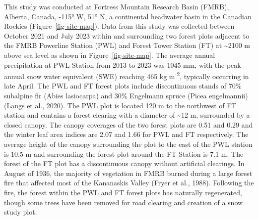 \documentclass[
  letterpaper,
  DIV=11,
  numbers=noendperiod]{scrartcl}
\begin{document}
This study was conducted at Fortress Mountain Research Basin (FMRB),
Alberta, Canada, -115° W, 51° N, a continental headwater basin in the
Canadian Rockies (Figure~\ref{fig-site-map}). Data from this study was
collected between October 2021 and July 2023 within and surrounding two
forest plots adjacent to the FMRB Powerline Station (PWL) and Forest
Tower Station (FT) at \textasciitilde2100 m above sea level as shown in
Figure~\ref{fig-site-map}. The average annual precipitation at PWL
Station from 2013 to 2023 was 1045 mm, with the peak annual snow water
equivalent (SWE) reaching 465 kg m\textsuperscript{-2}, typically
occurring in late April. The PWL and FT forest plots include
discontinuous stands of 70\% subalpine fir (Abies lasiocarpa) and 30\%
Engelmann spruce (Picea engelmannii) (Langs et al., 2020). The PWL plot
is located 120 m to the northwest of FT station and contains a forest
clearing with a diameter of \textasciitilde12 m, surrounded by a closed
canopy. The canopy coverages of the two forest plots are 0.51 and 0.29
and the winter leaf area indices are 2.07 and 1.66 for PWL and FT
respectively. The average height of the canopy surrounding the plot to
the east of the PWL station is 10.5 m and surrounding the forest plot
around the FT Station is 7.1 m. The forest of the FT plot has a
discontinuous canopy without artificial clearings. In August of 1936,
the majority of vegetation in FMRB burned during a large forest fire
that affected most of the Kananaskis Valley (Fryer et al., 1988).
Following the fire, the forest within the PWL and FT forest plots has
naturally regenerated, though some trees have been removed for road
clearing and creation of a snow study plot.
\end{document}

